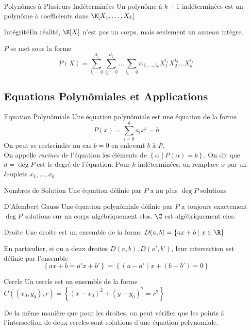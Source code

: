 \documentclass{cours}
\begin{document}
\begin{définition}{Polynômes à Plusieurs Indéterminées}{}
Un polynôme à $k + 1$ indéterminées est un polynôme à coefficients dans $\K[X_{1}, \ldots, X_{k}]$
\end{définition}
\begin{remarque}{Intégrité}{}En réalité, $\K[X]$ n'est pas un corps, mais seulement un anneau intègre.\end{remarque}
$P$ se met sous la forme
\[
    P(X) = \sum_{i_{1} = 0}^{d_{1}}\sum_{i_{2}=0}^{d_{2}}\ldots\sum_{i_{k} = 0} \alpha_{i_{1}, \ldots, i_{k}}X_{1}^{i_{1}}X_{2}^{i_{2}}\ldots X_{k}^{i_{k}}
\]
\subsection{Equations Polynômiales et Applications}
\begin{définition}{Equation Polynômiale}{}
Une équation polynômiale est une équation de la forme
\[
    P(x) = \sum_{i = 0}^{d} a_{i}x^{i} = b
\]
On peut se restreindre au cas $b = 0$ en enlevant $b$ à $P$.\\
On appelle \emph{racines} de l'équation les éléments de $\left\{\alpha \mid P(\alpha) = b \right\}$. On dit que $d = \deg P$ est le degré de l'équation.
Pour $k$ indéterminées, on remplace $x$ par un $k$-uplets $x_{1}, \ldots, x_{k}$
\end{définition}


\begin{propositionfr}{Nombres de Solution}{}
    Une équation définie par $P$ a au plus $\deg P$ solutions
\end{propositionfr}

\begin{théorème}{D'Alembert Gauss}{}
Une équation polynômiale définie par $P$ a toujours exactement $\deg P$ solutions sur un corps algébriquement clos. $\C$ est algébriquement clos.
\end{théorème}

\begin{définition}{Droite}{}
Une droite est un ensemble de la forme $D(a, b) = \{ax + b \mid x \in \R\}$
\end{définition}

En particulier, si on a deux droites $D(a, b), D(a', b')$, leur intersection est définie par l'ensemble
\[
    \left\{ax + b = a'x + b'\right\} = \left\{(a - a')x + (b - b') = 0\right\}
\]

\begin{définition}{Cercle}{}
Un cercle est un ensemble de la forme $C((x_{0}, y_{0}), r) = \left\{(x - x_{0})^{2} + (y - y_{0})^{2} = r^{2}\right\}$
\end{définition}
De la même manière que pour les droites, on peut vérifier que les points à l'intersection de deux cercles sont solutions d'une équation polynomiale.
\end{document}
